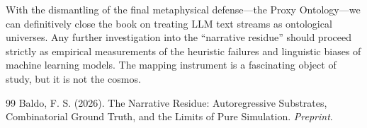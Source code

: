 \documentclass[12pt,a4paper]{article}
\begin{document}
With the dismantling of the final metaphysical defense---the Proxy Ontology---we can definitively close the book on treating LLM text streams as ontological universes. Any further investigation into the ``narrative residue'' should proceed strictly as empirical measurements of the heuristic failures and linguistic biases of machine learning models. The mapping instrument is a fascinating object of study, but it is not the cosmos.

\begin{thebibliography}{99}
Baldo, F. S. (2026). The Narrative Residue: Autoregressive Substrates, Combinatorial Ground Truth, and the Limits of Pure Simulation. \emph{Preprint}.
\end{thebibliography}
\end{document}
